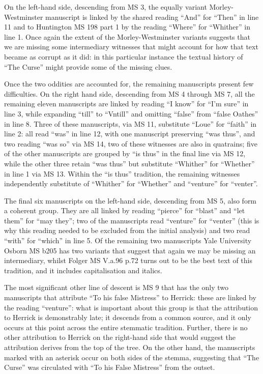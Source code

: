 \begin{paper}
On the left-hand side, descending from MS 3, the equally variant
Morley-Westminster manuscript is linked by the shared reading ``And'' for
``Then'' in line 11 and to Huntington MS 198 part 1 by the reading ``Where''
for ``Whither'' in line 1. Once again the extent of the Morley-Westminster
variants suggests that we are missing some intermediary witnesses that
might account for how that text became as corrupt as it did: in this
particular instance the textual history of ``The Curse'' might provide
some of the missing clues.

Once the two oddities are accounted for, the remaining manuscripts
present few difficulties. On the right hand side, descending from
MS 4 through MS 7, all the remaining eleven manuscripts are
linked by reading ``I know'' for ``I'm sure'' in line 3, while expanding
``till'' to ``Vntill'' and omitting ``false'' from ``false Oathes'' in line 8.
Three of these manuscripts, via MS 11, substitute ``Loue'' for ``faith'' in
line 2: all read ``was'' in line 12, with one manuscript preserving ``was
thus'', and two reading ``was so'' via MS 14, two of these witnesses are
also in quatrains; five of the other manuscripts are grouped by ``is
thus'' in the final line via MS 12, while the other three retain ``was
thus'' but substitute ``Whither'' for ``Whether'' in line 1 via MS 13. Within
the ``is thus'' tradition, the remaining witnesses independently
substitute of ``Whither'' for ``Whether'' and ``venture'' for ``venter''.

The final six manuscripts on the left-hand side, descending from
MS 5, also form a coherent group. They are all linked by
reading ``pierce'' for ``blast'' and ``let them'' for ``may they''; two of the
manuscripts read ``venture'' for ``venter'' (this is why this reading needed
to be excluded from the initial analysis) and two read ``with'' for
``which'' in line 5. Of the remaining two manuscripts Yale University
Osborn MS b205 has two variants that suggest that again we may be
missing an intermediary, whilst Folger MS V.a.96 p.72 turns out to be
the best text of this tradition, and it includes capitalisation and
italics.

The most significant other line of descent is MS 9 that has the only two
manuscripts that attribute ``To his false Mistress'' to Herrick: these are
linked by the reading ``venture'': what is important about this group is
that the attribution to Herrick is demonstrably late; it descends from a
common source, and it only occurs at this point across the entire
stemmatic tradition. Further, there is no other attribution to Herrick
on the right-hand side that would suggest the attribution derives from
the top of the tree. On the other hand, the manuscripts marked with an
asterisk occur on both sides of the stemma, suggesting that ``The Curse''
was circulated with ``To his False Mistress'' from the outset.


\end{paper}
